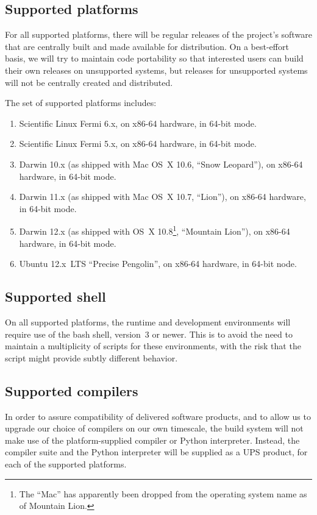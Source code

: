 \documentclass[draftmode,draftwater]{memarticle}
\begin{document}
\subsection{Supported platforms}

For all supported platforms, there will be regular releases of the
project's software that are centrally built and made available for
distribution. On a best-effort basis, we will try to maintain code
portability so that interested users can build their own releases on
unsupported systems, but releases for unsupported systems will not be
centrally created and distributed.

The set of supported platforms includes:
\begin{enumerate}
\item Scientific Linux Fermi 6.x, on x86-64 hardware, in 64-bit mode.
\item Scientific Linux Fermi 5.x, on x86-64 hardware, in 64-bit mode.
\item Darwin 10.x (as shipped with Mac OS~X 10.6, ``Snow Leopard''), on
  x86-64 hardware, in 64-bit mode.
\item Darwin 11.x (as shipped with Mac OS~X 10.7, ``Lion''), on x86-64
  hardware, in 64-bit mode.
\item Darwin 12.x (as shipped with OS~X 10.8\footnote{The ``Mac'' has
    apparently been dropped from the operating system name as of
    Mountain Lion.}, ``Mountain Lion''), on x86-64 hardware, in 64-bit
  mode.
\item Ubuntu 12.x~LTS ``Precise Pengolin'', on x86-64 hardware, in
  64-bit node.
\end{enumerate}

\subsection{Supported shell}

On all supported platforms, the runtime and development environments
will require use of the bash shell, version~3 or newer. This is to avoid
the need to maintain a multiplicity of scripts for these environments,
with the risk that the script might provide subtly different behavior.

\subsection{Supported compilers}

In order to assure compatibility of delivered software products, and to
allow us to upgrade our choice of compilers on our own timescale, the
build system will not make use of the platform-supplied compiler or
Python interpreter. Instead, the compiler suite and the Python
interpreter will be supplied as a UPS product, for each of the supported
platforms.
\end{document}
